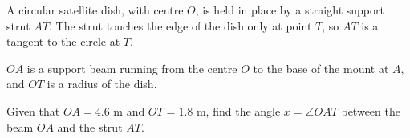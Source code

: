 \documentclass[11pt]{article}
\begin{document}
\begin{question}
\noindent A circular satellite dish, with centre $O$, is held in place by a straight support strut $AT$. The strut touches the edge of the dish only at point $T$, so $AT$ is a tangent to the circle at $T$.

\noindent $OA$ is a support beam running from the centre $O$ to the base of the mount at $A$, and $OT$ is a radius of the dish.

\noindent Given that $OA = 4.6$ m and $OT = 1.8$ m, find the angle $x = \angle OAT$ between the beam $OA$ and the strut $AT$.

\begin{center}
\end{center}

\vspace{4cm}
\begin{flushright}
\end{flushright}
\end{question}
\end{document}
